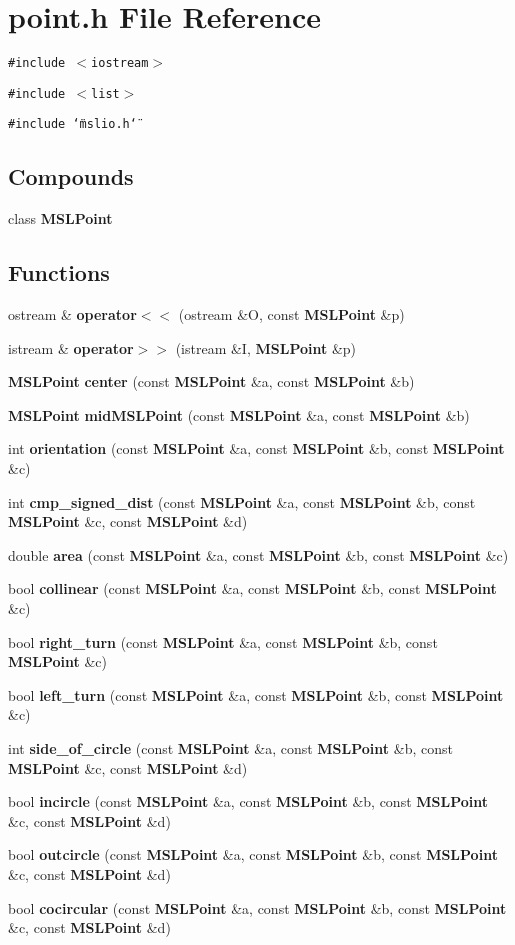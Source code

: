 \section{point.h File Reference}
\label{point_8h}
{\tt \#include $<$iostream$>$}\par
{\tt \#include $<$list$>$}\par
{\tt \#include \char`\"{}mslio.h\char`\"{}}\par
\subsection*{Compounds}
\begin{CompactItemize}
\item 
class {\bf MSLPoint}
\end{CompactItemize}
\subsection*{Functions}
\begin{CompactItemize}
\item 
ostream \& {\bf operator$<$$<$} (ostream \&O, const {\bf MSLPoint} \&p)
\item 
istream \& {\bf operator$>$$>$} (istream \&I, {\bf MSLPoint} \&p)
\item 
{\bf MSLPoint} {\bf center} (const {\bf MSLPoint} \&a, const {\bf MSLPoint} \&b)
\item 
{\bf MSLPoint} {\bf mid\-MSLPoint} (const {\bf MSLPoint} \&a, const {\bf MSLPoint} \&b)
\item 
int {\bf orientation} (const {\bf MSLPoint} \&a, const {\bf MSLPoint} \&b, const {\bf MSLPoint} \&c)
\item 
int {\bf cmp\_\-signed\_\-dist} (const {\bf MSLPoint} \&a, const {\bf MSLPoint} \&b, const {\bf MSLPoint} \&c, const {\bf MSLPoint} \&d)
\item 
double {\bf area} (const {\bf MSLPoint} \&a, const {\bf MSLPoint} \&b, const {\bf MSLPoint} \&c)
\item 
bool {\bf collinear} (const {\bf MSLPoint} \&a, const {\bf MSLPoint} \&b, const {\bf MSLPoint} \&c)
\item 
bool {\bf right\_\-turn} (const {\bf MSLPoint} \&a, const {\bf MSLPoint} \&b, const {\bf MSLPoint} \&c)
\item 
bool {\bf left\_\-turn} (const {\bf MSLPoint} \&a, const {\bf MSLPoint} \&b, const {\bf MSLPoint} \&c)
\item 
int {\bf side\_\-of\_\-circle} (const {\bf MSLPoint} \&a, const {\bf MSLPoint} \&b, const {\bf MSLPoint} \&c, const {\bf MSLPoint} \&d)
\item 
bool {\bf incircle} (const {\bf MSLPoint} \&a, const {\bf MSLPoint} \&b, const {\bf MSLPoint} \&c, const {\bf MSLPoint} \&d)
\item 
bool {\bf outcircle} (const {\bf MSLPoint} \&a, const {\bf MSLPoint} \&b, const {\bf MSLPoint} \&c, const {\bf MSLPoint} \&d)
\item 
bool {\bf cocircular} (const {\bf MSLPoint} \&a, const {\bf MSLPoint} \&b, const {\bf MSLPoint} \&c, const {\bf MSLPoint} \&d)
\end{CompactItemize}



